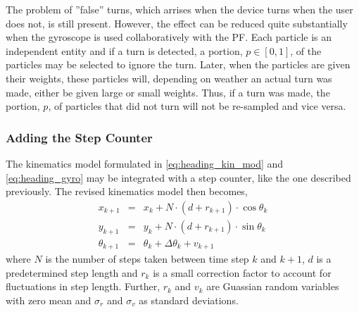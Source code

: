 \documentclass{LTHthesis}
\begin{document}
The problem of ''false'' turns, which arrises when the device turns when the user does not, is still present. However, the effect can be reduced quite substantially when the gyroscope is used collaboratively with the PF. Each particle is an independent entity and if a turn is detected, a portion, $p\in[0,1]$, of the particles may be selected to ignore the turn. Later, when the particles are given their weights, these particles will, depending on weather an actual turn was made, either be given large or small weights. Thus, if a turn was made, the portion, $p$, of particles that did not turn will not be re-sampled and vice versa. 

\subsubsection{Adding the Step Counter}
%
The kinematics model formulated in \ref{eq:heading_kin_mod} and \ref{eq:heading_gyro} may be integrated with a step counter, like the one described previously. The revised kinematics model then becomes,
%
\begin{eqnarray}
x_{k+1} &  = & x_k + N\cdot (d + r_{k+1})\cdot\cos{\theta_k} \nonumber\\
y_{k+1} & = &y_k + N\cdot (d + r_{k+1})\cdot\sin{\theta_k}\label{eq:heading_step_kin_mod}\\
\theta_{k+1} & = & \theta_k +\Delta\theta_k+ v_{k+1} \nonumber
\end{eqnarray}  
%
where $N$ is the number of steps taken between time step $k$ and $k+1$, $d$ is a predetermined step length and $ r_k$ is a small correction factor to account for fluctuations in step length. Further, $r_k$ and $v_k$ are Guassian random variables with zero mean and $\sigma_r$ and  $\sigma_v$ as standard deviations.
\end{document}
